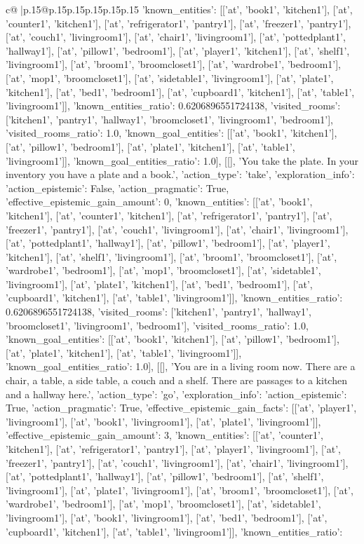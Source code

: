 \documentclass{article}
\begin{document}
{\begin{supertabular}{c@{$\;$}|p{.15\linewidth}@{}p{.15\linewidth}p{.15\linewidth}p{.15\linewidth}p{.15\linewidth}p{.15\linewidth}}
{{{'known_entities': [['at', 'book1', 'kitchen1'], ['at', 'counter1', 'kitchen1'], ['at', 'refrigerator1', 'pantry1'], ['at', 'freezer1', 'pantry1'], ['at', 'couch1', 'livingroom1'], ['at', 'chair1', 'livingroom1'], ['at', 'pottedplant1', 'hallway1'], ['at', 'pillow1', 'bedroom1'], ['at', 'player1', 'kitchen1'], ['at', 'shelf1', 'livingroom1'], ['at', 'broom1', 'broomcloset1'], ['at', 'wardrobe1', 'bedroom1'], ['at', 'mop1', 'broomcloset1'], ['at', 'sidetable1', 'livingroom1'], ['at', 'plate1', 'kitchen1'], ['at', 'bed1', 'bedroom1'], ['at', 'cupboard1', 'kitchen1'], ['at', 'table1', 'livingroom1']], 'known_entities_ratio': 0.6206896551724138, 'visited_rooms': ['kitchen1', 'pantry1', 'hallway1', 'broomcloset1', 'livingroom1', 'bedroom1'], 'visited_rooms_ratio': 1.0, 'known_goal_entities': [['at', 'book1', 'kitchen1'], ['at', 'pillow1', 'bedroom1'], ['at', 'plate1', 'kitchen1'], ['at', 'table1', 'livingroom1']], 'known_goal_entities_ratio': 1.0}}], [[], 'You take the plate. In your inventory you have a plate and a book.', {'action_type': 'take', 'exploration_info': {'action_epistemic': False, 'action_pragmatic': True, 'effective_epistemic_gain_amount': 0, 'known_entities': [['at', 'book1', 'kitchen1'], ['at', 'counter1', 'kitchen1'], ['at', 'refrigerator1', 'pantry1'], ['at', 'freezer1', 'pantry1'], ['at', 'couch1', 'livingroom1'], ['at', 'chair1', 'livingroom1'], ['at', 'pottedplant1', 'hallway1'], ['at', 'pillow1', 'bedroom1'], ['at', 'player1', 'kitchen1'], ['at', 'shelf1', 'livingroom1'], ['at', 'broom1', 'broomcloset1'], ['at', 'wardrobe1', 'bedroom1'], ['at', 'mop1', 'broomcloset1'], ['at', 'sidetable1', 'livingroom1'], ['at', 'plate1', 'kitchen1'], ['at', 'bed1', 'bedroom1'], ['at', 'cupboard1', 'kitchen1'], ['at', 'table1', 'livingroom1']], 'known_entities_ratio': 0.6206896551724138, 'visited_rooms': ['kitchen1', 'pantry1', 'hallway1', 'broomcloset1', 'livingroom1', 'bedroom1'], 'visited_rooms_ratio': 1.0, 'known_goal_entities': [['at', 'book1', 'kitchen1'], ['at', 'pillow1', 'bedroom1'], ['at', 'plate1', 'kitchen1'], ['at', 'table1', 'livingroom1']], 'known_goal_entities_ratio': 1.0}}], [[], 'You are in a living room now. There are a chair, a table, a side table, a couch and a shelf. There are passages to a kitchen and a hallway here.', {'action_type': 'go', 'exploration_info': {'action_epistemic': True, 'action_pragmatic': True, 'effective_epistemic_gain_facts': [['at', 'player1', 'livingroom1'], ['at', 'book1', 'livingroom1'], ['at', 'plate1', 'livingroom1']], 'effective_epistemic_gain_amount': 3, 'known_entities': [['at', 'counter1', 'kitchen1'], ['at', 'refrigerator1', 'pantry1'], ['at', 'player1', 'livingroom1'], ['at', 'freezer1', 'pantry1'], ['at', 'couch1', 'livingroom1'], ['at', 'chair1', 'livingroom1'], ['at', 'pottedplant1', 'hallway1'], ['at', 'pillow1', 'bedroom1'], ['at', 'shelf1', 'livingroom1'], ['at', 'plate1', 'livingroom1'], ['at', 'broom1', 'broomcloset1'], ['at', 'wardrobe1', 'bedroom1'], ['at', 'mop1', 'broomcloset1'], ['at', 'sidetable1', 'livingroom1'], ['at', 'book1', 'livingroom1'], ['at', 'bed1', 'bedroom1'], ['at', 'cupboard1', 'kitchen1'], ['at', 'table1', 'livingroom1']], 'known_entities_ratio': }}}
\end{supertabular}}
\end{document}
